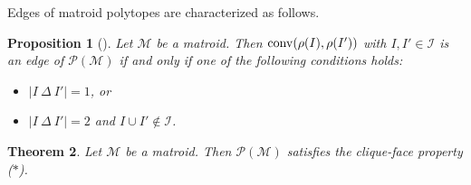 \documentclass[12pt]{amsart}
\newtheorem{thm}{Theorem} [section]
\newtheorem{prop}[thm]{Proposition}
\theoremstyle{definition}
\numberwithin{thm}{section}
\numberwithin{equation}{section}
\begin{document}
Edges of matroid polytopes are characterized as follows.

\begin{prop}[{\cite[Theorem 4.3]{HK}}]\label{edge_ind}
    Let ${\mathcal M}$ be a matroid.
    Then ${\rm conv}(\rho(I), \rho(I'))$ with $I,I' \in {\mathcal I}$ is an edge of ${\mathcal P}({\mathcal M})$ if and only if 
    one of the following conditions holds:
    \begin{itemize}
        \item[{\rm (i)}]
        $|I \ \Delta\  I'| = 1$, or
        \item[{\rm (ii)}]
        $|I \ \Delta\  I'| = 2$ and $I \cup I' \notin {\mathcal I}$.
    \end{itemize}
\end{prop}



\begin{thm}
    Let $\mathcal{M}$ be a matroid.
    Then ${\mathcal P}({\mathcal M})$ satisfies the clique-face property ($*$).
\end{thm}
\end{document}
